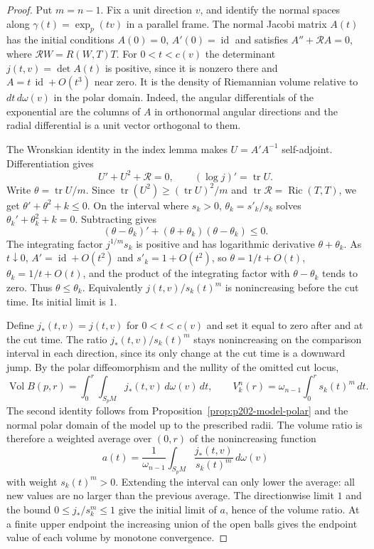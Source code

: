 \documentclass[11pt,oneside,openany]{book}
\theoremstyle{plain}
\theoremstyle{definition}
\theoremstyle{remark}
\begin{document}
\begin{proof}
Put \(m=n-1\). Fix a unit direction \(v\), and identify the
normal spaces along \(\gamma(t)=\exp_p(tv)\) in a parallel
frame. The normal Jacobi matrix \(A(t)\) has the initial
conditions \(A(0)=0\), \(A'(0)=\operatorname{id}\) and
satisfies \(A''+\mathcal R A=0\), where
\(\mathcal R W=R(W,T)T\). For \(0<t<c(v)\) the determinant
\(j(t,v)=\det A(t)\) is positive, since it is nonzero there
and \(A=t\,\operatorname{id}+O(t^3)\) near zero. It is the
density of Riemannian volume relative to \(dt\,d\omega(v)\)
in the polar domain. Indeed, the angular differentials
of the exponential are the columns of \(A\) in orthonormal
angular directions and the radial differential is a unit
vector orthogonal to them.

The Wronskian identity in the index lemma makes
\(U=A'A^{-1}\) self-adjoint. Differentiation gives
\[
 U'+U^2+\mathcal R=0,\qquad
 (\log j)'=\operatorname{tr}U.
\]
Write \(\theta=\operatorname{tr}U/m\). Since
\(\operatorname{tr}(U^2)\ge(\operatorname{tr}U)^2/m\) and
\(\operatorname{tr}\mathcal R=\operatorname{Ric}(T,T)\), we get
\(\theta'+\theta^2+k\le0\). On the interval where
\(s_k>0\), \(\theta_k=s'_k/s_k\) solves
\(\theta_k'+\theta_k^2+k=0\). Subtracting gives
\[
 (\theta-\theta_k)' +(\theta+\theta_k)(\theta-\theta_k)\le0.
\]
The integrating factor \(j^{1/m}s_k\) is positive and has
logarithmic derivative \(\theta+\theta_k\).
As \(t\downarrow0\), \(A'= \operatorname{id}+O(t^2)\)
and \(s'_k=1+O(t^2)\), so
\(\theta=1/t+O(t)\), \(\theta_k=1/t+O(t)\), and the
product of the integrating factor with \(\theta-\theta_k\)
tends to zero. Thus \(\theta\le\theta_k\). Equivalently
\(j(t,v)/s_k(t)^m\) is nonincreasing before the cut time.
Its initial limit is \(1\).

Define \(j_*(t,v)=j(t,v)\) for \(0<t<c(v)\) and set it
equal to zero after and at the cut time. The ratio
\(j_*(t,v)/s_k(t)^m\) stays nonincreasing on the comparison
interval in each direction, since its only change at the
cut time is a downward jump. By the polar diffeomorphism
and the nullity of the omitted cut locus,
\[
 \operatorname{Vol} B(p,r)=\int_0^r\int_{S_pM}
                         j_*(t,v)\,d\omega(v)\,dt,\qquad
 V_k^n(r)=\omega_{n-1}\int_0^r s_k(t)^m\,dt .
\]
The second identity follows from
Proposition~\ref{prop:p202-model-polar} and the normal polar
domain of the model up to the prescribed radii.
The volume ratio is therefore a weighted average over
\((0,r)\) of the nonincreasing function
\[
 a(t)=\frac{1}{\omega_{n-1}}
       \int_{S_pM}\frac{j_*(t,v)}{s_k(t)^m}\,d\omega(v)
\]
with weight \(s_k(t)^m>0\). Extending the interval can only
lower the average: all new values are no larger than the
previous average. The directionwise limit \(1\) and the
bound \(0\le j_*/s_k^m\le1\) give the initial limit of
\(a\), hence of the volume ratio. At a finite upper endpoint
the increasing union of the open balls gives the endpoint
value of each volume by monotone convergence.
\end{proof}
\end{document}
